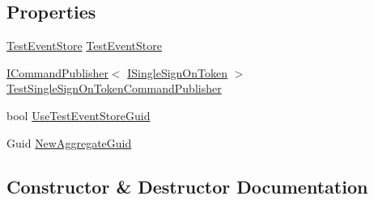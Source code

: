 \subsection*{Properties}
\begin{DoxyCompactItemize}
\item 
\hyperlink{classCqrs_1_1Tests_1_1Substitutes_1_1TestEventStore}{Test\+Event\+Store} \hyperlink{classCqrs_1_1Tests_1_1Substitutes_1_1TestDependencyResolver_a1102f66163e9313777a41fff54aa5a75}{Test\+Event\+Store}
\item 
\hyperlink{interfaceCqrs_1_1Commands_1_1ICommandPublisher}{I\+Command\+Publisher}$<$ \hyperlink{interfaceCqrs_1_1Authentication_1_1ISingleSignOnToken}{I\+Single\+Sign\+On\+Token} $>$ \hyperlink{classCqrs_1_1Tests_1_1Substitutes_1_1TestDependencyResolver_a41f52b962e9f15a0d06834022182f760}{Test\+Single\+Sign\+On\+Token\+Command\+Publisher}
\item 
bool \hyperlink{classCqrs_1_1Tests_1_1Substitutes_1_1TestDependencyResolver_a000d2ee924b6f60bc77174495ad9ca89}{Use\+Test\+Event\+Store\+Guid}
\item 
Guid \hyperlink{classCqrs_1_1Tests_1_1Substitutes_1_1TestDependencyResolver_a8df7ff7fb6f8bd3b2da43fadd46f1cf8}{New\+Aggregate\+Guid}
\end{DoxyCompactItemize}


\subsection{Constructor \& Destructor Documentation}
\mbox{\label{classCqrs_1_1Tests_1_1Substitutes_1_1TestDependencyResolver_ad2c04971107ccbd80aa3f5c0440438cb}} 
